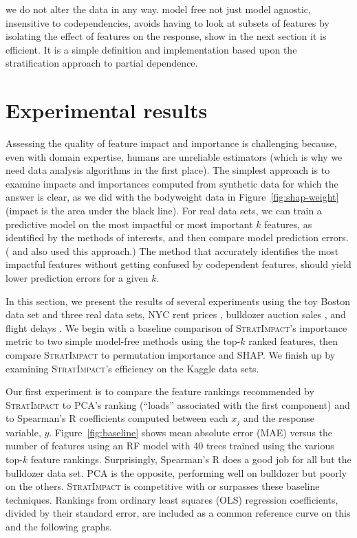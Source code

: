 \documentclass[11pt]{article}
\newcommand{\figref}[1]{Figure~\ref{#1}}
\newcommand{\todo}[1]{{{\small\color{red}{[#1]}}}}
\newcommand{\simp}{\fontfamily{cmr}\textsc{\small StratImpact}}
\begin{document}
\todo{Summarize our benefits.} we do not alter the data in any way. model free not just model agnostic, insensitive to codependencies, avoids having to look at subsets of features by isolating the effect of features on the response, show in the next section it is efficient. It is a simple definition and implementation based upon the stratification approach to partial dependence. 

\section{Experimental results}\label{sec:experiments}

Assessing the quality of feature impact and importance is challenging because, even with domain expertise, humans are unreliable estimators (which is why we need data analysis algorithms in the first place).  The simplest approach is to examine impacts and importances computed from synthetic data for which the answer is clear, as we did with the bodyweight data in \figref{fig:shap-weight} (impact is the area under the black line).  For real data sets, we can train a predictive model on the most impactful or most important $k$ features, as identified by the methods of interests, and then compare model prediction errors. (\citealt{mRMR} and \citealt{tsanas} also used this approach.) The method that accurately identifies the most impactful features without getting confused by codependent features, should yield lower prediction errors for a given $k$. 

In this section, we present the results of several experiments using the toy Boston data set and three real data sets, NYC rent prices \citep{rent}, bulldozer auction sales \citep{bulldozer}, and flight delays \citep{flights}. We begin with a baseline comparison of \simp{}'s importance metric to two simple model-free methods using the top-$k$ ranked features, then compare \simp{} to permutation importance and SHAP. We finish up by examining \simp's efficiency on the Kaggle data sets.

Our first experiment is to compare the feature rankings recommended by \simp{} to PCA's ranking (``loads'' associated with the first component) and to Spearman's R coefficients computed between each $x_j$ and the response variable, $y$. \figref{fig:baseline} shows mean absolute error  (MAE) versus the number of features using an RF model with 40 trees trained using the various top-$k$ feature rankings. Surprisingly, Spearman's R does a good job for all but the bulldozer data set. PCA is the opposite, performing well on bulldozer but poorly on the others. \simp{} is competitive with or surpasses these baseline techniques.  Rankings from ordinary least squares (OLS) regression coefficients, divided by their standard error, are included as a common reference curve on this and the following graphs. 
\end{document}
